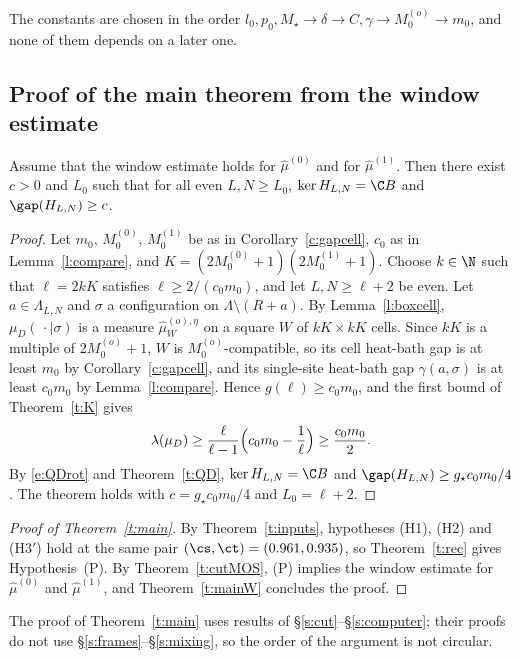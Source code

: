 The constants are chosen in the order $l_0, p_0, M_\star \to \delta \to C, \gamma \to M_0^{(o)} \to m_0$, and none of them depends on a later one.

\subsection{Proof of the main theorem from the window estimate}\label{s:proofmain}

\begin{theorem}\label{t:mainW}
Assume that the window estimate holds for $\hat\mu^{(0)}$ and for $\hat\mu^{(1)}$. Then there exist $c > 0$ and $L_0$ such that for all even $L, N \ge L_0$, $\ker H_{L, N} = \C B$ and $\gap(H_{L, N}) \ge c$.
\end{theorem}

\begin{proof}
Let $m_0$, $M_0^{(0)}$, $M_0^{(1)}$ be as in Corollary~\ref{c:gapcell}, $c_0$ as in Lemma~\ref{l:compare}, and $K = (2M_0^{(0)} + 1)(2M_0^{(1)} + 1)$. Choose $k \in \N$ such that $\ell = 2kK$ satisfies $\ell \ge 2/(c_0 m_0)$, and let $L, N \ge \ell + 2$ be even. Let $a \in \Lambda_{L, N}$ and $\sigma$ a configuration on $\Lambda \setminus (R + a)$. By Lemma~\ref{l:boxcell}, $\mu_D(\, \cdot \mid \sigma)$ is a measure $\hat\mu^{(o), \eta}_W$ on a square $W$ of $kK \times kK$ cells. Since $kK$ is a multiple of $2 M_0^{(o)} + 1$, $W$ is $M_0^{(o)}$-compatible, so its cell heat-bath gap is at least $m_0$ by Corollary~\ref{c:gapcell}, and its single-site heat-bath gap $\gamma(a, \sigma)$ is at least $c_0 m_0$ by Lemma~\ref{l:compare}. Hence $g(\ell) \ge c_0 m_0$, and the first bound of Theorem~\ref{t:K} gives
\begin{equation*}
\lambda(\mu_D) \ge \frac{\ell}{\ell - 1} \Bigl( c_0 m_0 - \frac1\ell \Bigr) \ge \frac{c_0 m_0}{2} .
\end{equation*}
By \eqref{e:QDrot} and Theorem~\ref{t:QD}, $\ker H_{L, N} = \C B$ and $\gap(H_{L, N}) \ge g_\star c_0 m_0 / 4$. The theorem holds with $c = g_\star c_0 m_0/4$ and $L_0 = \ell + 2$.
\end{proof}

\begin{proof}[Proof of Theorem~\ref{t:main}]
By Theorem~\ref{t:inputs}, hypotheses (H1), (H2) and (H3$'$) hold at the same pair $(\cs, \ct) = (0.961, 0.935)$, so Theorem~\ref{t:rec} gives Hypothesis~(P). By Theorem~\ref{t:cutMOS}, (P) implies the window estimate for $\hat\mu^{(0)}$ and $\hat\mu^{(1)}$, and Theorem~\ref{t:mainW} concludes the proof.
\end{proof}

The proof of Theorem~\ref{t:main} uses results of \S\ref{s:cut}--\S\ref{s:computer}; their proofs do not use \S\ref{s:frames}--\S\ref{s:mixing}, so the order of the argument is not circular.
